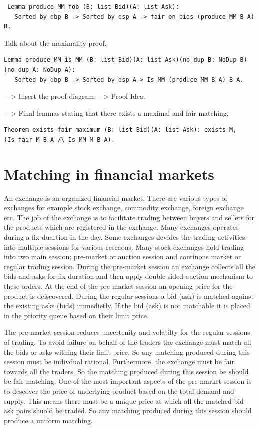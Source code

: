 \documentclass[a4paper,UKenglish,cleveref, autoref]{lipics-v2019}
\begin{document}
\begin{verbatim}
 Lemma produce_MM_fob (B: list Bid)(A: list Ask):
   Sorted by_dbp B -> Sorted by_dsp A -> fair_on_bids (produce_MM B A) B.
\end{verbatim}

Talk about the maximality proof. 
\begin{verbatim}
Lemma produce_MM_is_MM (B: list Bid)(A: list Ask)(no_dup_B: NoDup B)(no_dup_A: NoDup A):
   Sorted by_dbp B -> Sorted by_dsp A-> Is_MM (produce_MM B A) B A.
\end{verbatim}
---> Insert the proof diagram 
---> Proof Idea. 

---> Final lemmas stating that there exists a maximal and fair matching.
\begin{verbatim}
Theorem exists_fair_maximum (B: list Bid)(A: list Ask): exists M, (Is_fair M B A /\ Is_MM M B A).
\end{verbatim}


\section{Matching in financial markets} 
An exchange is an organized financial market. There are various types of exchanges for example stock exchange, commodity exchange, foreign exchange etc. The job of the exchange is to facilitate trading between buyers and sellers for the products which are registered in the exchange. Many exchanges operates during a fix duartion in the day. Some exchanges devides the trading activities into multiple sessions for various reseaons. Many stock exchanges hold trading into two main session; pre-market or auction session and continous market or regular trading session. During the pre-market session an exchange collects all the bids and asks for fix duration and then apply double sided auction mechanism to these orders. At the end of the pre-market session an opening price for the product is deiscovered. During the regular sessions a bid (ask) is matched against the existing asks (bids) immedietly. If the bid (ask) is not matchable it is placed in the priority queue based on their limit price. 

The pre-market session reduces uncertenity and volatilty for the regular sessions of trading. To avoid failure on behalf of the traders the exchange must match all the bids or asks withing their limit price. So any matching produced during this session must be indivdual rational. Furthermore, the exchange must be fair towards all the traders. So the matching produced during this session be should be fair matching. One of the most important aspects of the pre-market session is to descover the price of underlying product based on the total demand and supply. This means there must be a unique price at which all the matched bid-ask pairs shuold be traded. So any matching produced during this session should produce a uniform matching. 
\end{document}
